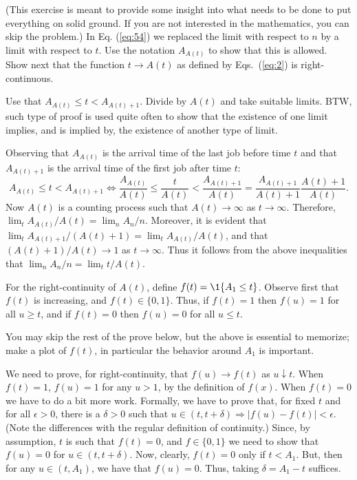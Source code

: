 \begin{exercise}
(This exercise is meant to provide some insight into what needs
  to be done to put everything on solid ground.  If you are not
  interested in the mathematics, you can skip the problem.)
   In  Eq. (\ref{eq:54}) we replaced the limit with respect to $n$ by a
    limit with respect to $t$.  Use
    the notation $A_{A(t)}$ to show that  this is allowed.
  Show next that the function $t\to A(t)$ as defined by Eqs.~(\ref{eq:2})
  is right-continuous. 
    \begin{hint}
 Use that $A_{A(t)} \leq t < A_{A(t)+1}$. Divide by $A(t)$
      and take suitable limits. BTW, such type of proof is used quite
      often to show that the existence of one limit implies, and is
      implied by, the existence of another type of limit.  
    \end{hint}
 \begin{solution}
 Observing that $A_{A(t)}$ is the arrival time of the last job
    before time $t$ and that $A_{A(t)+1}$ is the arrival time of the
    first job after time $t$: 
  \begin{equation*}
    A_{A(t)}  \leq t  < A_{A(t)+1} \Leftrightarrow 
    \frac{A_{A(t)}} {A(t)}  \leq \frac{t}{A(t)}  <\frac{A_{A(t)+1}}{A(t)} = \frac{A_{A(t)+1}}{A(t)+1}\frac{A(t)+1}{A(t)}.
  \end{equation*}
  Now $A(t)$ is a counting process such that $A(t)\to\infty$ as
  $t\to\infty$. Therefore, $\lim_t A_{A(t)}/A(t) = \lim_n
  A_n/n$.
  Moreover, it is evident that
  $\lim_t A_{A(t)+1}/(A(t)+1) = \lim_t A_{A(t)}/A(t)$, and that
  $(A(t)+1)/A(t)\to 1$ as $t\to\infty$. Thus it follows from the above
  inequalities that $\lim_n A_n/n = \lim_t t/A(t)$.
     



  For the right-continuity of $A(t)$, define $f(t) = \1{A_1 \leq t}$.
  Observe first that $f(t)$ is increasing, and $f(t)\in\{0,1\}$.
  Thus, if $f(t)=1$ then $f(u)=1$ for all $u\geq t$, and if $f(t)=0$ then $f(u) = 0$ for all $u\leq t$.

    You may skip the rest of the prove below, but the above is
    essential to memorize; make a plot of $f(t)$, in particular the
    behavior around $A_1$ is important.

    We need to prove, for right-continuity, that $f(u)\to f(t) $ as
    $u\downarrow t$. When $f(t)=1$, $f(u)=1$ for any $u>1$, by the
    definition of $f(x)$. When $f(t)=0$ we have to do a bit more
    work. Formally, we have to prove that, for fixed $t$ and for all
    $\epsilon > 0$, there is a $\delta>0$ such that
    $u\in(t, t+\delta) \Rightarrow |f(u) -f(t)| < \epsilon$. (Note the
    differences with the regular definition of continuity.) Since, by
    assumption, $t$ is such that $f(t)=0$, and $f\in\{0,1\}$ we need
    to show that $f(u)=0$ for $u\in(t, t+\delta)$. Now, clearly, 
    $f(t)=0$ only if $t < A_1$.  But, then for any $u\in(t, A_1)$, we
    have that $f(u) = 0$. Thus, taking $\delta = A_1 - t$ suffices.


\end{solution}
\end{exercise}
